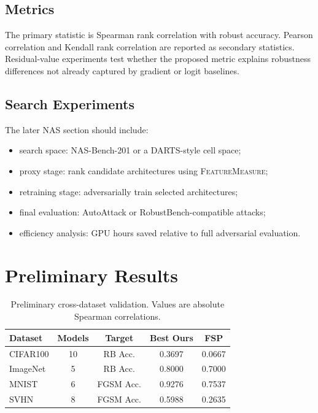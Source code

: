 \documentclass[10pt,twocolumn]{article}
\newcommand{\Ours}{\textsc{FeatureMeasure}}
\begin{document}
\subsection{Metrics}

The primary statistic is Spearman rank correlation with robust accuracy.
Pearson correlation and Kendall rank correlation are reported as secondary statistics.
Residual-value experiments test whether the proposed metric explains robustness differences not already captured by gradient or logit baselines.

\subsection{Search Experiments}

The later NAS section should include:
\begin{itemize}
  \item search space: NAS-Bench-201 or a DARTS-style cell space;
  \item proxy stage: rank candidate architectures using \Ours{};
  \item retraining stage: adversarially train selected architectures;
  \item final evaluation: AutoAttack or RobustBench-compatible attacks;
  \item efficiency analysis: GPU hours saved relative to full adversarial evaluation.
\end{itemize}

\section{Preliminary Results}

\begin{table}[t]
  \centering
  \caption{Preliminary cross-dataset validation. Values are absolute Spearman correlations.}
  \label{tab:prelim}
  \begin{tabular}{lcccc}
    \toprule
    Dataset & Models & Target & Best Ours & FSP \\
    \midrule
    CIFAR100 & 10 & RB Acc. & 0.3697 & 0.0667 \\
    ImageNet & 5 & RB Acc. & 0.8000 & 0.7000 \\
    MNIST & 6 & FGSM Acc. & 0.9276 & 0.7537 \\
    SVHN & 8 & FGSM Acc. & 0.5988 & 0.2635 \\
    \bottomrule
  \end{tabular}
\end{table}
\end{document}
